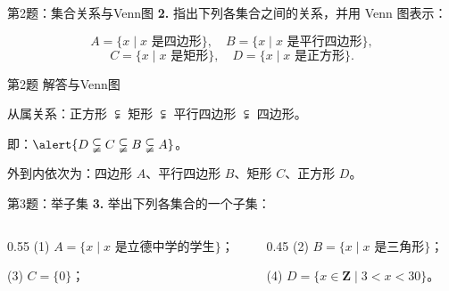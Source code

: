 \documentclass[10pt,aspectratio=169,serif]{beamer}
\begin{document}
\begin{frame}[t]{第2题：集合关系与Venn图}
\textbf{2.} 指出下列各集合之间的关系，并用 Venn 图表示：

\vspace{0.5em}
\[
A = \{x \mid x \text{ 是四边形}\},\quad
B = \{x \mid x \text{ 是平行四边形}\},
\]
\[
C = \{x \mid x \text{ 是矩形}\},\quad
D = \{x \mid x \text{ 是正方形}\}.
\]
\end{frame}

\begin{frame}[t]{第2题 解答与Venn图}
\begin{tcolorbox}[colback=orange!10,colframe=orange,title=\textbf{解}]
从属关系：正方形 $\subsetneqq$ 矩形 $\subsetneqq$ 平行四边形 $\subsetneqq$ 四边形。

即：$\alert{D \subsetneqq C \subsetneqq B \subsetneqq A}$。

\vspace{0.5em}
\begin{center}
\end{center}
{\small 外到内依次为：四边形 $A$、平行四边形 $B$、矩形 $C$、正方形 $D$。}
\end{tcolorbox}
\end{frame}

\begin{frame}[t]{第3题：举子集}
\textbf{3.} 举出下列各集合的一个子集：

\vspace{0.8em}
\begin{columns}
\begin{column}{0.55\textwidth}
(1) $A = \{x \mid x \text{ 是立德中学的学生}\}$；

(3) $C = \{0\}$；
\end{column}
\begin{column}{0.45\textwidth}
(2) $B = \{x \mid x \text{ 是三角形}\}$；

(4) $D = \{x \in \mathbf{Z} \mid 3 < x < 30\}$。
\end{column}
\end{columns}
\end{frame}
\end{document}
